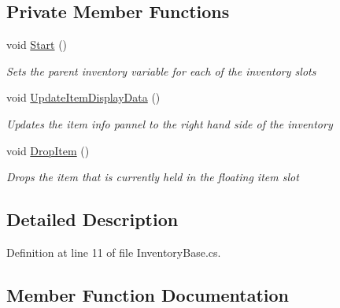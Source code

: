 \subsection*{Private Member Functions}
\begin{DoxyCompactItemize}
\item 
void \hyperlink{class_bee_game_1_1_inventory_1_1_inventory_base_a22d2b2a1621c8cf19925692ac8cc5923}{Start} ()
\begin{DoxyCompactList}\small\item\em Sets the parent inventory variable for each of the inventory slots \end{DoxyCompactList}\item 
void \hyperlink{class_bee_game_1_1_inventory_1_1_inventory_base_abceadbaeed5505437ba8141da8642dc7}{Update\+Item\+Display\+Data} ()
\begin{DoxyCompactList}\small\item\em Updates the item info pannel to the right hand side of the inventory \end{DoxyCompactList}\item 
void \hyperlink{class_bee_game_1_1_inventory_1_1_inventory_base_a53861c2cc0bd7af6a6569168c8866bf4}{Drop\+Item} ()
\begin{DoxyCompactList}\small\item\em Drops the item that is currently held in the floating item slot \end{DoxyCompactList}\end{DoxyCompactItemize}


\subsection{Detailed Description}


Definition at line 11 of file Inventory\+Base.\+cs.



\subsection{Member Function Documentation}
\mbox{\label{class_bee_game_1_1_inventory_1_1_inventory_base_a53861c2cc0bd7af6a6569168c8866bf4}} 

